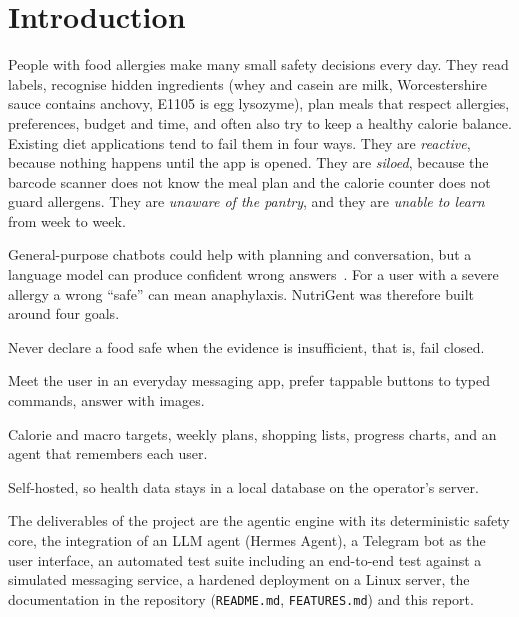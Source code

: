 \documentclass[11pt,a4paper]{article}
\begin{document}
{\small\tableofcontents}
\newpage

\section{Introduction}

People with food allergies make many small safety decisions every day. They read labels, recognise
hidden ingredients (whey and casein are milk, Worcestershire sauce contains anchovy, E1105 is egg
lysozyme), plan meals that respect allergies, preferences, budget and time, and often also try to keep
a healthy calorie balance. Existing diet applications tend to fail them in four ways. They are
\emph{reactive}, because nothing happens until the app is opened. They are \emph{siloed}, because the
barcode scanner does not know the meal plan and the calorie counter does not guard allergens. They are
\emph{unaware of the pantry}, and they are \emph{unable to learn} from week to week.

General-purpose chatbots could help with planning and conversation, but a language model can produce
confident wrong answers~\cite{ji2023hallucination}. For a user with a severe allergy a wrong ``safe''
can mean anaphylaxis. NutriGent was therefore built around four goals.

\begin{description}[leftmargin=1.2cm,style=nextline]
  \item[G1 Safety first] Never declare a food safe when the evidence is insufficient, that is, fail closed.
  \item[G2 Low friction] Meet the user in an everyday messaging app, prefer tappable buttons to typed
        commands, answer with images.
  \item[G3 Personalisation] Calorie and macro targets, weekly plans, shopping lists, progress charts,
        and an agent that remembers each user.
  \item[G4 Privacy] Self-hosted, so health data stays in a local database on the operator's server.
\end{description}

The deliverables of the project are the agentic engine with its deterministic safety core, the
integration of an LLM agent (Hermes Agent), a Telegram bot as the user interface, an automated test
suite including an end-to-end test against a simulated messaging service, a hardened deployment on a
Linux server, the documentation in the repository (\texttt{README.md}, \texttt{FEATURES.md}) and this
report.
\end{document}
